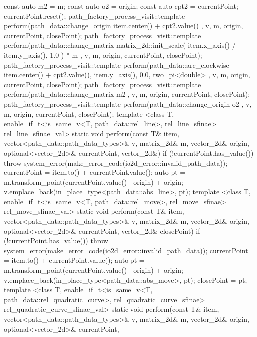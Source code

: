 \begin{codeblock}
{{{{        }
        const auto m2 = m;
        const auto o2 = origin;
        const auto cpt2 = currentPoint;
        currentPoint.reset();
        path_factory_process_visit::template perform(path_data::change_origin{ 
          item.center() + cpt2.value() }, v, m, origin, currentPoint, 
          closePoint);
        path_factory_process_visit::template perform(path_data::change_matrix{ 
          matrix_2d::init_scale({ item.x_axis() / item.y_axis(), 1.0 }) * m }, 
          v, m, origin, currentPoint, closePoint);
        path_factory_process_visit::template perform(path_data::arc_clockwise{ 
          item.center() + cpt2.value(), item.y_axis(), 0.0, two_pi<double> }, 
          v, m, origin, currentPoint, closePoint);
        path_factory_process_visit::template perform(path_data::change_matrix{ 
          m2 }, v, m, origin, currentPoint, closePoint);
        path_factory_process_visit::template perform(path_data::change_origin{ 
          o2 }, v, m, origin, currentPoint, closePoint);
      }
      template <class T, enable_if_t<is_same_v<T, path_data::rel_line>, 
        rel_line_sfinae> = rel_line_sfinae_val>
      static void perform(const T& item, vector<path_data::path_data_types>& v, 
        matrix_2d& m, vector_2d& origin, optional<vector_2d>& currentPoint, 
        vector_2d&) {
        if (!currentPoint.has_value()) {
          throw system_error(make_error_code(io2d_error::invalid_path_data));
        }
        currentPoint = item.to() + currentPoint.value();
        auto pt = m.transform_point(currentPoint.value() - origin) + origin;
        v.emplace_back(in_place_type<path_data::abs_line>, pt);
      }
      template <class T, enable_if_t<is_same_v<T, path_data::rel_move>, 
        rel_move_sfinae> = rel_move_sfinae_val>
      static void perform(const T& item, vector<path_data::path_data_types>& v, 
        matrix_2d& m, vector_2d& origin, optional<vector_2d>& currentPoint, 
        vector_2d& closePoint) {
        if (!currentPoint.has_value()) {
          throw system_error(make_error_code(io2d_error::invalid_path_data));
        }
        currentPoint = item.to() + currentPoint.value();
        auto pt = m.transform_point(currentPoint.value() - origin) + origin;
        v.emplace_back(in_place_type<path_data::abs_move>, pt);
        closePoint = pt;
      }
      template <class T, enable_if_t<is_same_v<T, 
        path_data::rel_quadratic_curve>, rel_quadratic_curve_sfinae> = 
        rel_quadratic_curve_sfinae_val>
      static void perform(const T& item, vector<path_data::path_data_types>& v, 
        matrix_2d& m, vector_2d& origin, optional<vector_2d>& currentPoint, 
}}
\end{codeblock}
